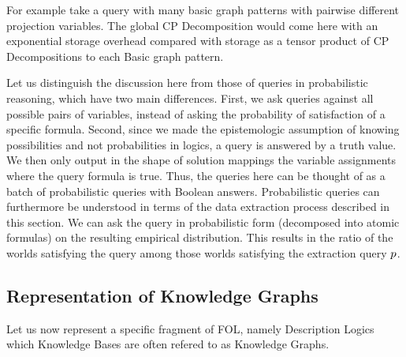 
\begin{example}
	For example take a query with many basic graph patterns with pairwise different projection variables. 
	The global CP Decomposition would come here with an exponential storage overhead compared with storage as a tensor product of CP Decompositions to each Basic graph pattern.
\end{example}


\begin{remark}
	Let us distinguish the discussion here from those of queries in probabilistic reasoning, which have two main differences.
	First, we ask queries against all possible pairs of variables, instead of asking the probability of satisfaction of a specific formula. 
	Second, since we made the epistemologic assumption of knowing possibilities and not probabilities in logics, a query is answered by a truth value.
	We then only output in the shape of solution mappings the variable assignments where the query formula is true.
 	Thus, the queries here can be thought of as a batch of probabilistic queries with Boolean answers.
	Probabilistic queries can furthermore be understood in terms of the data extraction process described in this section.
	We can ask the query in probabilistic form (decomposed into atomic formulas) on the resulting empirical distribution.
	This results in the ratio of the worlds satisfying the query among those worlds satisfying the extraction query $p$.
\end{remark}


\subsection{Representation of Knowledge Graphs}

Let us now represent a specific fragment of FOL, namely Description Logics which Knowledge Bases are often refered to as Knowledge Graphs.

